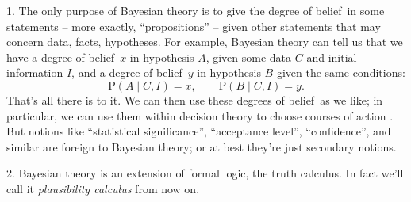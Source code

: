 \documentclass[\ifafour a4paper,12pt,\else a5paper,10pt,\fi%
onecolumn,oneside,article,%
british%
]{memoir}
\theoremstyle{remark}
\theoremstyle{innote}
\newcommand*{\citep}{\parencites}
\newcommand*{\p}{\mathrm{P}}%
\renewcommand*{\|}{\mathpunct{|}}
\newcommand*{\dob}{degree of belief}
\newcommand*{\dobs}{degrees of belief}
\begin{document}
1. The only purpose of Bayesian theory is to give the \dob\ in some
statements -- more exactly, \enquote{propositions}
\citep{copietal1953_r2014,barwiseetal1999_r2003} -- given other statements
that may concern data, facts, hypotheses. For example, Bayesian theory can
tell us that we have a \dob\ $x$ in hypothesis $A$, given some data $C$ and
initial information $I$, and a \dob\ $y$ in hypothesis $B$ given the same
conditions:
\begin{equation*}
  \p(A \| C, I ) = x, \qquad   \p(B \| C, I ) = y.
\end{equation*}
That's all there is to it. We can then use these \dobs\ as we like; in
particular, we can use them within decision theory to choose courses of
action \citep{raiffaetal1961_r2000,prattetal1995_r1996,soxetal1988_r2013}.
But notions like \enquote{statistical significance}, \enquote{acceptance
  level}, \enquote{confidence}, and similar are foreign to Bayesian theory;
or at best they're just secondary notions.

\medskip

2. Bayesian theory is an extension of formal logic, the truth calculus. In
fact we'll call it \emph{plausibility calculus} from now on.
\end{document}
